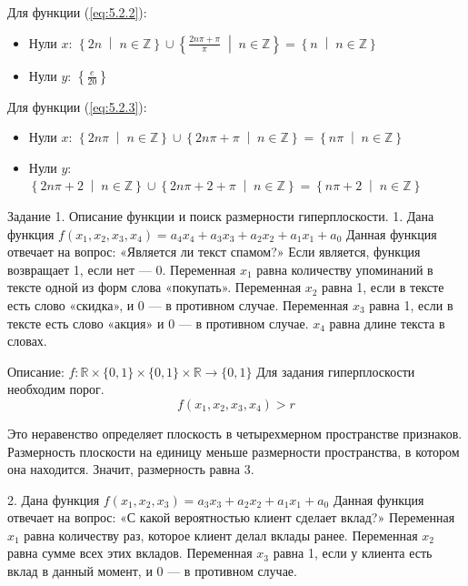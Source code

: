 \documentclass[14pt,a4paper]{extarticle}
\begin{document}
Для функции (\ref{eq:5.2.2}):
\begin{itemize}
    \item Нули $x$:
    $\displaystyle \left\{2 n\; \middle|\; n \in \mathbb{Z}\right\} \cup \left\{\frac{2 n \pi + \pi}{\pi}\; \middle|\; n \in \mathbb{Z}\right\} = \left\{n \;\middle|\; n \in \mathbb{Z}\right\}$ 
    \item Нули $y$:
    $\displaystyle \left\{\frac{e}{20}\right\}$
\end{itemize}

Для функции (\ref{eq:5.2.3}):
\begin{itemize}
    \item Нули $x$:
    $\displaystyle \left\{2 n \pi\; \middle|\; n \in \mathbb{Z}\right\} \cup \left\{2 n \pi + \pi\; \middle|\; n \in \mathbb{Z}\right\} = \left\{n\pi \;\middle|\; n \in \mathbb{Z}\right\}$
    \item Нули $y$:
    $\displaystyle \left\{2 n \pi + 2\; \middle|\; n \in \mathbb{Z}\right\} \cup \left\{2 n \pi + 2 + \pi\; \middle|\; n \in \mathbb{Z}\right\} = \left\{n\pi + 2 \;\middle|\; n \in \mathbb{Z}\right\}$
\end{itemize}

Задание 1. Описание функции и поиск размерности
гиперплоскости.
1. Дана функция \(f(x_1, x_2, x_3, x_4) = a_4 x_4 + a_3 x_3 + a_2 x_2 + a_1 x_1 + a_0\)
Данная функция отвечает на вопрос: «Является ли текст спамом?»
Если является, функция возвращает 1, если нет — 0. Переменная
$x_1$ равна количеству упоминаний в тексте одной из форм слова 
«покупать». Переменная $x_2$ равна 1, если в тексте есть слово
«скидка», и 0 — в противном случае. Переменная $x_3$ равна 1,
если в тексте есть слово «акция» и 0 — в противном случае.
$x_4$ равна длине текста в словах.

Описание: $f : \mathbb{R} \times\{0, 1\}\times\{0, 1\}\times\mathbb{R} \rightarrow \{0, 1\}$
Для задания гиперплоскости необходим порог.
\begin{equation*}
    f(x_1, x_2, x_3, x_4) > r
\end{equation*}

Это неравенство определяет плоскость в четырехмерном пространстве
признаков. Размерность плоскости на единицу меньше размерности
пространства, в котором она находится. Значит, размерность равна 3.

2. Дана функция \(f(x_1, x_2, x_3) = a_3 x_3 + a_2 x_2 + a_1 x_1 + a_0\)
Данная функция отвечает на вопрос: «С какой вероятностью клиент
сделает вклад?» Переменная $x_1$ равна количеству раз, которое клиент
делал вклады ранее. Переменная $x_2$ равна сумме всех этих вкладов.
Переменная $x_3$ равна 1, если у клиента есть вклад в данный момент,
и 0 — в противном случае.
\end{document}
